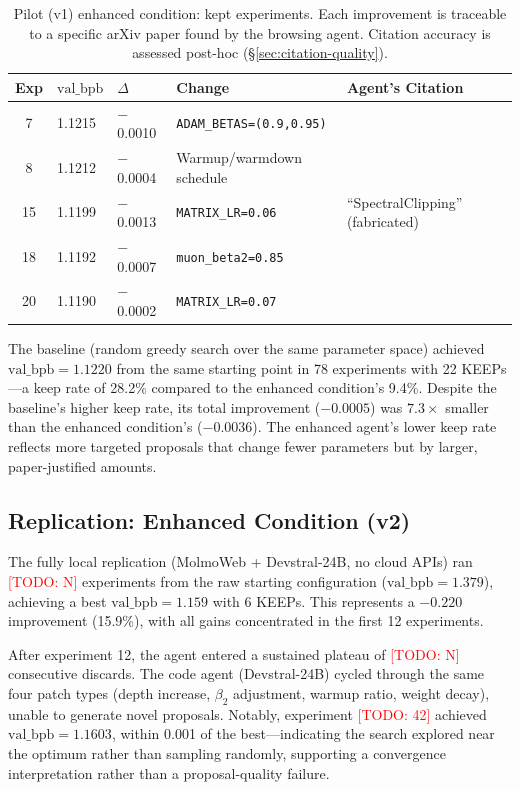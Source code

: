 \documentclass[11pt]{article}
\newcommand{\todo}[1]{\textcolor{red}{[TODO: #1]}}
\newcommand{\val}{\text{val\_bpb}}
\begin{document}
\begin{table}[h]
\centering
\caption{Pilot (v1) enhanced condition: kept experiments. Each
  improvement is traceable to a specific arXiv paper found by the
  browsing agent. Citation accuracy is assessed post-hoc
  (\S\ref{sec:citation-quality}).}
\label{tab:pilot-keeps}
\begin{tabular}{@{}cllll@{}}
\toprule
Exp & $\val$ & $\Delta$ & Change & Agent's Citation \\
\midrule
7  & 1.1215 & $-$0.0010 & \texttt{ADAM\_BETAS=(0.9,0.95)} & \citet{li2026aggc} \\
8  & 1.1212 & $-$0.0004 & Warmup/warmdown schedule & \citet{defazio2023optimal} \\
15 & 1.1199 & $-$0.0013 & \texttt{MATRIX\_LR=0.06} & ``SpectralClipping'' (fabricated) \\
18 & 1.1192 & $-$0.0007 & \texttt{muon\_beta2=0.85} & \citet{qian2025muon} \\
20 & 1.1190 & $-$0.0002 & \texttt{MATRIX\_LR=0.07} & \citet{qiu2025hyperparameter} \\
\bottomrule
\end{tabular}
\end{table}

The baseline (random greedy search over the same parameter space)
achieved $\val = 1.1220$ from the same starting point in 78
experiments with 22 KEEPs---a keep rate of 28.2\% compared to the
enhanced condition's 9.4\%. Despite the baseline's higher keep rate,
its total improvement ($-0.0005$) was $7.3\times$ smaller than the
enhanced condition's ($-0.0036$). The enhanced agent's lower keep
rate reflects more targeted proposals that change fewer parameters
but by larger, paper-justified amounts.

\subsection{Replication: Enhanced Condition (v2)}
\label{sec:results-replication}

The fully local replication (MolmoWeb + Devstral-24B, no cloud APIs)
ran \todo{N} experiments from the raw starting configuration
($\val = 1.379$), achieving a best $\val = 1.159$ with 6 KEEPs.
This represents a $-0.220$ improvement (15.9\%), with all gains
concentrated in the first 12 experiments.

After experiment 12, the agent entered a sustained plateau of \todo{N}
consecutive discards. The code agent (Devstral-24B) cycled through the
same four patch types (depth increase, $\beta_2$ adjustment, warmup
ratio, weight decay), unable to generate novel proposals. Notably,
experiment \todo{42} achieved $\val = 1.1603$, within 0.001 of the
best---indicating the search explored near the optimum rather than
sampling randomly, supporting a convergence interpretation rather than
a proposal-quality failure.
\end{document}
